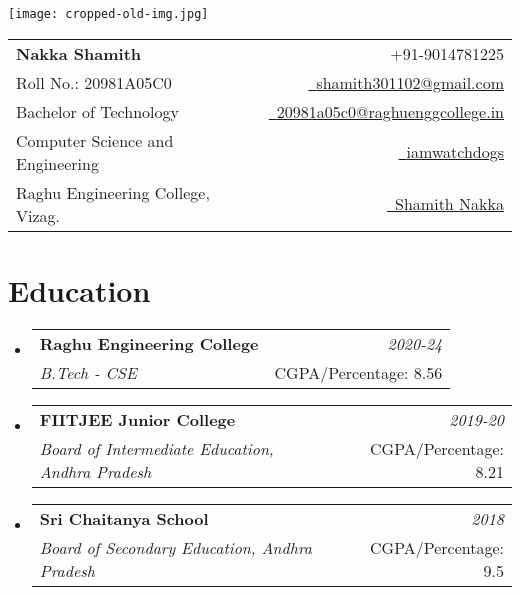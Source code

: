 \documentclass[a4paper,11pt]{article}
\makeatletter
\newcommand{\resumeSubheading}[4]{
\vspace{0.5mm}\item
    \begin{tabular*}{0.98\textwidth}[t]{l@{\extracolsep{\fill}}r}
        \textbf{#1} & \textit{\footnotesize{#4}} \\
        \textit{\footnotesize{#3}} &  \footnotesize{#2}\\
    \end{tabular*}
    \vspace{-2.4mm}
}
\newcommand{\resumeSubHeadingListStart}{\begin{itemize}[leftmargin=*,labelsep=0mm]}
\newcommand{\resumeSubHeadingListEnd}{\end{itemize}\vspace{2mm}}
\newcommand{\name}{Nakka Shamith} %
\newcommand{\course}{Bachelor of Technology} %
\newcommand{\roll}{20981A05C0} %
\newcommand{\phone}{9014781225} %
\newcommand{\emaila}{shamith301102@gmail.com} %
\newcommand{\emailb}{20981a05c0@raghuenggcollege.in} %
\makeatother
\begin{document}
\selectfont


\parbox{2.6cm}{%
\texttt{[image: cropped-old-img.jpg]}
}
\parbox{\dimexpr\linewidth-2.9cm\relax}{
\begin{tabularx}{\linewidth}{L r} \\
  \textbf{\Large \name} & {\raisebox{0.0\height}{\footnotesize \faPhone}\ +91-\phone}\\
  {Roll No.: \roll} & \href{mailto:\emaila}{\raisebox{0.0\height}{\footnotesize \faEnvelope}\ {\emaila}} \\
  \course &  \href{mailto:\emailb}{\raisebox{0.0\height}{\footnotesize \faEnvelope}\ {\emailb}}\\
  {Computer Science and Engineering} &  \href{https://github.com/iamwatchdogs/}{\raisebox{0.0\height}{\footnotesize \faGithub}\ {iamwatchdogs}} \\
  {Raghu Engineering College, Vizag.} & \href{https://www.linkedin.com/in/shamith-n-02b535226}{\raisebox{0.0\height}{\footnotesize \faLinkedin}\ {Shamith Nakka}}
\end{tabularx}
}





\section{\textbf{Education}}
  \resumeSubHeadingListStart
    \resumeSubheading
      {Raghu Engineering College}{CGPA/Percentage: 8.56}
      {B.Tech - CSE}{2020-24}
    \resumeSubheading
      {FIITJEE Junior College}{CGPA/Percentage: 8.21}
      {Board of Intermediate Education, Andhra Pradesh}{2019-20}
    \resumeSubheading
      {Sri Chaitanya School}{CGPA/Percentage: 9.5}
      {Board of Secondary Education, Andhra Pradesh}{2018}
  \resumeSubHeadingListEnd
\vspace{-5.5mm}
%



\end{document}
